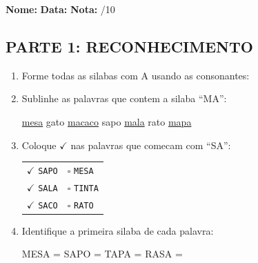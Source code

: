 \begin{exercicio}
\noindent\textbf{Nome:} \underline{\hspace{3.2cm}} \quad \textbf{Data:} \underline{\hspace{1.6cm}} \quad \textbf{Nota:} \underline{\hspace{0.9cm}}/10

\subsection*{PARTE 1: RECONHECIMENTO}

\begin{enumerate}
  \item Forme todas as silabas com A usando as consonantes:
  \begin{center}
  \end{center}

  \item Sublinhe as palavras que contem a silaba ``MA'':
  \begin{center}
  \uline{mesa} \quad gato \quad \uline{macaco} \quad sapo \quad \uline{mala} \quad rato \quad \uline{mapa}
  \end{center}

  \item Coloque $\checkmark$ nas palavras que comecam com ``SA'':
  \begin{center}
  \begin{tabular}{ll}
  $\checkmark$ \texttt{SAPO} & $\square$ \texttt{MESA} \\
  $\checkmark$ \texttt{SALA} & $\square$ \texttt{TINTA} \\
  $\checkmark$ \texttt{SACO} & $\square$ \texttt{RATO}
  \end{tabular}
  \end{center}

  \item Identifique a primeira silaba de cada palavra:
  \begin{center}
  MESA = \underline{\hspace{1cm}} \quad SAPO = \underline{\hspace{1cm}} \quad TAPA = \underline{\hspace{1cm}} \quad RASA = \underline{\hspace{1cm}}
  \end{center}


\end{enumerate}
\end{exercicio}

